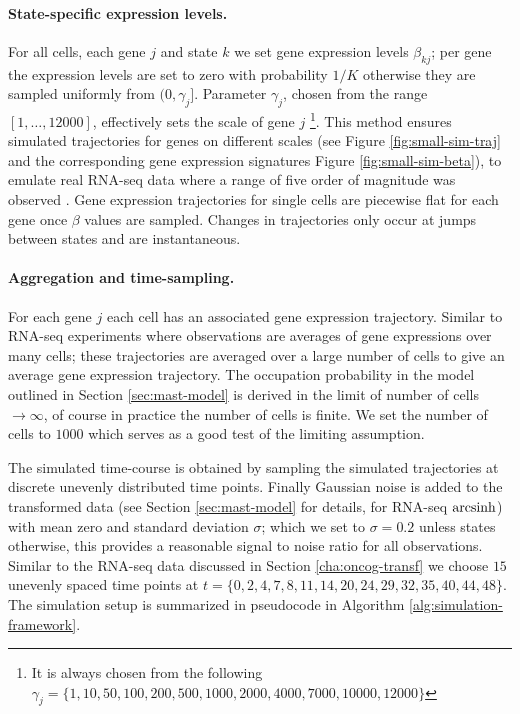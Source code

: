 \paragraph{State-specific expression levels.}
\label{sec:state-spec-expr}
For all cells, each gene $j$ and state $k$ we set gene expression levels $\beta_{kj}$; per gene the expression levels are set to zero with probability $1/K$ otherwise they are sampled uniformly from $(0, \gamma_j]$. Parameter $\gamma_j$, chosen from the range $[1, \ldots, 12000]$, effectively sets the scale of gene $j$ \footnote{It is always chosen from the following $\gamma_j = \lbrace 1, 10, 50, 100, 200, 500, 1000, 2000, 4000, 7000, 10000, 12000 \rbrace$}. This method ensures simulated trajectories for genes on different scales (see Figure \ref{fig:small-sim-traj} and the corresponding gene expression signatures Figure \ref{fig:small-sim-beta}), to emulate real RNA-seq data  where a range of five order of magnitude was observed \citep{Wang:2009ur,Mortazavi:2008jj}. Gene expression trajectories for single cells are piecewise flat for each gene once $\beta$ values are sampled. Changes in trajectories only occur at jumps between states and are instantaneous.

\paragraph{Aggregation and time-sampling.}
\label{sec:aggr-time-sampl}
For each gene $j$ each cell has an associated gene expression trajectory. Similar to RNA-seq experiments where observations are averages of gene expressions over many cells; these trajectories are averaged over a large number of cells to give an average gene expression trajectory. The occupation probability in the model outlined in Section \ref{sec:mast-model} is derived in the limit of number of cells $\rightarrow \infty$, of course in practice the number of cells is finite. We set the number of cells to $1000$ which serves as a good test of the limiting assumption.

The simulated time-course is obtained by sampling the simulated trajectories at discrete unevenly distributed time points. Finally Gaussian noise is added to the transformed data (see Section \ref{sec:mast-model} for details, for RNA-seq $\operatorname{arcsinh}$) with mean zero and standard deviation $\sigma$; which we set to $\sigma=0.2$ unless states otherwise, this provides a reasonable signal to noise ratio for all observations. Similar to the RNA-seq data discussed in Section \ref{cha:oncog-transf} we choose $15$ unevenly spaced  time points at $t=\lbrace 0,  2,  4,  7,  8, 11, 14, 20, 24, 29, 32, 35, 40, 44, 48\rbrace$. The simulation setup is summarized in pseudocode in Algorithm \ref{alg:simulation-framework}. 


